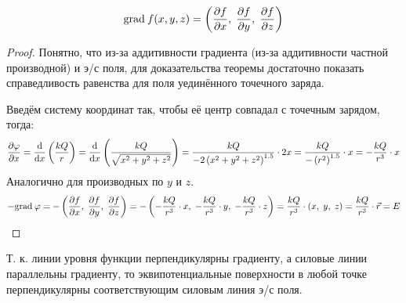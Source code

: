\[ \mathrm{grad}\: f(x, y, z) = \left( \frac{\partial f}{\partial x},\;\frac{\partial f}{\partial y},\;\frac{\partial f}{\partial z} \right) \]

\begin{proof}
	Понятно, что из-за аддитивности градиента (из-за аддитивности частной производной) и э/с поля, для доказательства теоремы достаточно показать справедливость равенства для поля уединённого точечного заряда.\par
	Введём систему координат так, чтобы её центр совпадал с точечным зарядом, тогда:
	\[ \frac{\partial \varphi}{\partial x} = \frac{\text{d}}{\text{d} x} \left( \frac{kQ}{r} \right) = \frac{\text{d}}{\text{d} x} \left( \frac{kQ}{\sqrt{x^2+y^2+z^2}} \right) = \frac{kQ}{-2 \left( x^2 + y^2 + z^2 \right)^{1.5}} \cdot 2x = \frac{kQ}{-\left( r^2 \right)^{1.5}} \cdot x = -\frac{kQ}{r^3} \cdot x\]
	Аналогично для производных по $y$ и $z$.
	\[ -\mathrm{grad}\: \varphi = -\left( \frac{\partial f}{\partial x},\;\frac{\partial f}{\partial y},\;\frac{\partial f}{\partial z} \right) = -\left( -\frac{kQ}{r^3} \cdot x,\; -\frac{kQ}{r^3} \cdot y,\; -\frac{kQ}{r^3} \cdot z \right) = \frac{kQ}{r^3} \cdot (x,\; y,\; z) = \frac{kQ}{r^3} \cdot \vec{r} = E \]
\end{proof}

Т. к. линии уровня функции перпендикулярны градиенту, а силовые линии параллельны градиенту, то эквипотенциальные поверхности в любой точке перпендикулярны соответствующим силовым линия э/с поля.